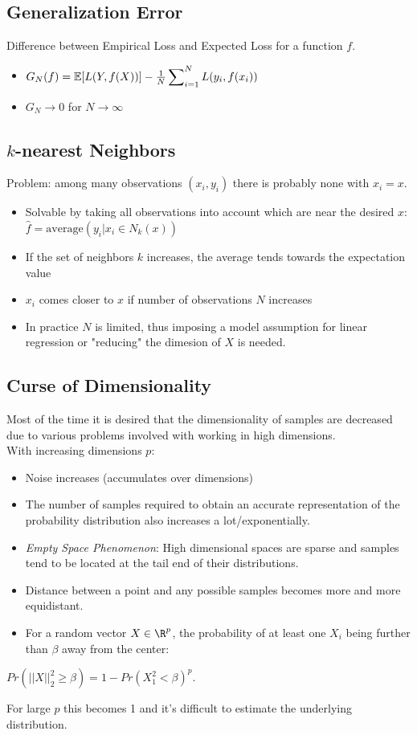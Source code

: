 \documentclass[english]{latex4ei/latex4ei_sheet}
\begin{document}
\begin{sectionbox}

\subsection{Generalization Error}
Difference between Empirical Loss and Expected Loss for a function $f$.
\begin{itemize}
    \item $G_N(f)=\mathbb{E}[L(Y,f(X))]-\frac{1}{N}\sideset{}{_{i=1}^N}\sum L(y_i,f(x_i))$
    \item $G_N \to 0$ for $N\to \infty$
\end{itemize}

\subsection{$k$-nearest Neighbors}
Problem: among many observations $(x_i,y_i)$ there is probably none with $x_i=x$.
\begin{itemize}
    \item Solvable by taking all observations into account which are near the desired $x$: $\hat{f}=\mathrm{average}(y_i|x_i \in N_k(x))$
    \item If the set of neighbors $k$ increases, the average tends towards the expectation value
    \item $x_i$ comes closer to $x$ if number of observations $N$ increases
    \item In practice $N$ is limited, thus imposing a model assumption for linear regression or "reducing" the dimesion of $X$ is needed.
\end{itemize}
\subsection{Curse of Dimensionality}
Most of the time it is desired that the dimensionality of samples are decreased due to various problems involved with working in high dimensions.\\
With increasing dimensions $p$:
\begin{itemize}
    \item Noise increases (accumulates over dimensions)
    \item The number of samples required to obtain an accurate representation of the probability distribution also increases a lot/exponentially.
    \item \emph{Empty Space Phenomenon}: High dimensional spaces are sparse and samples tend to be located at the tail end of their distributions.
    \item Distance between a point and any possible samples becomes more and more equidistant.
    \item For a random vector $X\in\R^p$, the probability of at least one $X_i$ being further than $\beta$ away from the center:
    \end{itemize}
    \begin{emphbox}
    $Pr(||X||^2_2\ge\beta)=1-Pr(X_1^2<\beta)^p$. 
    \end{emphbox}
    For large $p$ this becomes 1 and it's difficult to estimate the underlying distribution.\\


\end{sectionbox}
\end{document}
